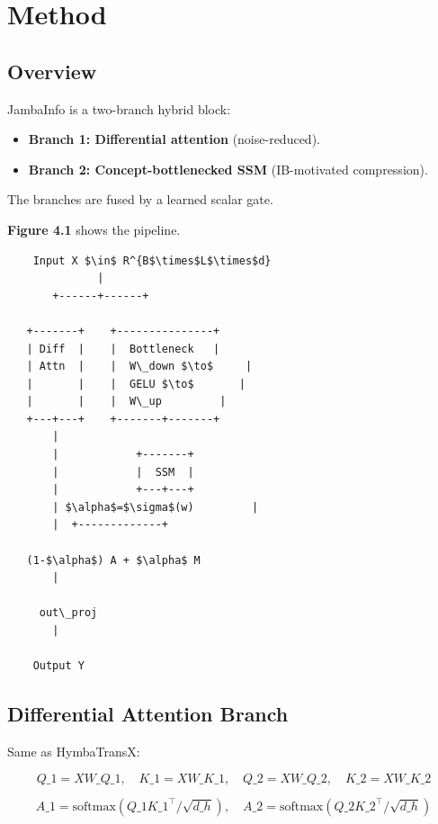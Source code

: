 \section{Method}

\subsection{Overview}

JambaInfo is a two-branch hybrid block:

\begin{itemize}
\item \textbf{Branch 1: Differential attention} (noise-reduced).
\item \textbf{Branch 2: Concept-bottlenecked SSM} (IB-motivated compression).

\end{itemize}
The branches are fused by a learned scalar gate.

\textbf{Figure 4.1} shows the pipeline.

\begin{lstlisting}
    Input X $\in$ R^{B$\times$L$\times$d}
              |
       +------+------+
                      
   +-------+    +---------------+
   | Diff  |    |  Bottleneck   |
   | Attn  |    |  W\_down $\to$     |
   |       |    |  GELU $\to$       |
   |       |    |  W\_up         |
   +---+---+    +-------+-------+
       |                 
       |            +-------+
       |            |  SSM  |
       |            +---+---+
       | $\alpha$=$\sigma$(w)         |
       |  +-------------+
           
   (1-$\alpha$) A + $\alpha$ M
       |
        
     out\_proj
       |
        
    Output Y
\end{lstlisting}

\subsection{Differential Attention Branch}

Same as HymbaTransX:

\[
Q\_1 = X W\_{Q\_1}, \quad K\_1 = X W\_{K\_1}, \quad
Q\_2 = X W\_{Q\_2}, \quad K\_2 = X W\_{K\_2}
\tag{4.1}
\]

\[
A\_1 = \text{softmax}(Q\_1 K\_1^\top / \sqrt{d\_h}), \quad
A\_2 = \text{softmax}(Q\_2 K\_2^\top / \sqrt{d\_h})
\tag{4.2}
\]


